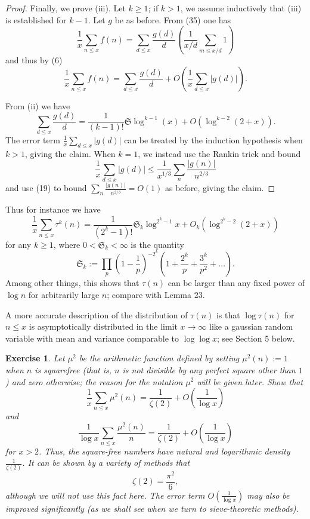 \documentclass[10pt,reqno]{amsart}
\newtheorem{exercise}[theorem]{Exercise}
\begin{document}
\begin{proof}
    Finally, we prove (iii). Let $k \geq 1$; if $k>1$, we assume inductively that (iii) is established for $k-1$. Let $g$ be as before. From (35) one has
    \[  \frac{1}{x} \sum_{n \leq x} f(n) = \sum_{d \leq x} \frac{g(d)}{d} \left(\frac{1}{x/d} \sum_{m \leq x/d} 1 \right) \]
    and thus by (6)
    \[  \frac{1}{x} \sum_{n \leq x} f(n) = \sum_{d \leq x} \frac{g(d)}{d} + O \left( \frac{1}{x} \sum_{d \leq x} |g(d)| \right). \]

    From (ii) we have
    \[  \sum_{d \leq x} \frac{g(d)}{d} = \frac{1}{(k-1)!} {\mathfrak S} \log^{k-1}(x) + O \left( \log^{k-2}(2 + x) \right).\]
    The error term $\frac{1}{x} \sum_{d \leq x} |g(d)|$ can be treated by the induction hypothesis when $k > 1$, giving the claim. When $k=1$, we instead use the Rankin trick and bound
    \[  \frac{1}{x} \sum_{d \leq x} |g(d)| \leq \frac{1}{x^{1/3}} \sum_n \frac{|g(n)|}{n^{2/3}}\]
    and use (19) to bound $\sum_n \frac{|g(n)|}{n^{2/3}} = O(1)$ as before, giving the claim. %
\end{proof}

Thus for instance we have
%
\[  \frac{1}{x} \sum_{n \leq x} \tau^k(n) = \frac{1}{(2^k-1)!} {\mathfrak S}_k \log^{2^k-1} x + O_k( \log^{2^k-2}(2+x) )\]
%
for any $k \geq 1$, where $0 < {\mathfrak S}_k < \infty$ is the quantity
%
\[  {\mathfrak S}_k := \prod_p \left(1-\frac{1}{p} \right)^{-2^k} \left(1 + \frac{2^k}{p} + \frac{3^k}{p^2} + \dots \right).\]
%
Among other things, this shows that $\tau(n)$ can be larger than any fixed power of $\log n$ for arbitrarily large $n$; compare with Lemma 23.

A more accurate description of the distribution of $\tau(n)$ is that $\log \tau(n)$ for $n \leq x$ is asymptotically distributed in the limit $x \rightarrow \infty$ like a gaussian random variable with mean and variance comparable to $\log\log x$; see Section 5 below.

\begin{exercise}
    Let $\mu^2$ be the arithmetic function defined by setting $\mu^2(n) := 1$ when $n$ is \emph{squarefree} (that is, $n$ is not divisible by any perfect square other than $1$) and zero otherwise; the reason for the notation $\mu^2$ will be given later. Show that
    \[  \frac{1}{x} \sum_{n \leq x} \mu^2(n) = \frac{1}{\zeta(2)} + O \left( \frac{1}{\log x} \right)\]
    and
    \[  \frac{1}{\log x} \sum_{n \leq x} \frac{\mu^2(n)}{n} = \frac{1}{\zeta(2)} + O \left( \frac{1}{\log x} \right)\]
    for $x > 2$. Thus, the square-free numbers have natural and logarithmic density $\frac{1}{\zeta(2)}$. It can be shown by a variety of methods that
    \[ \zeta(2) = \frac{\pi^2}{6}, \]
    although we will not use this fact here. The error term $O( \frac{1}{\log x})$ may also be improved significantly (as we shall see when we turn to sieve-theoretic methods).
\end{exercise}
\end{document}
